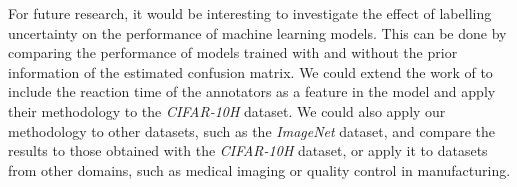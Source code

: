 For future research, it would be interesting to investigate the effect of
labelling uncertainty on the performance of machine learning models. This can be
done by comparing the performance of models trained with and without the prior
information of the estimated confusion matrix. We could extend the work of
\cite{kollerGoingOneHotEncoding2024} to include the reaction time of the
annotators as a feature in the model and apply their methodology to the
\textit{CIFAR-10H} dataset. We could also apply our methodology to other
datasets, such as the \textit{ImageNet} dataset, and compare the results to those
obtained with the \textit{CIFAR-10H} dataset, or apply it to datasets
from other domains, such as medical imaging or quality control in manufacturing.